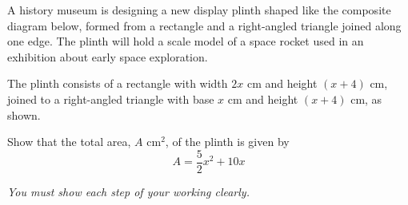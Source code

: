 \begin{question}
\noindent A history museum is designing a new display plinth shaped like the composite diagram below, formed from a rectangle and a right-angled triangle joined along one edge. The plinth will hold a scale model of a space rocket used in an exhibition about early space exploration.

\begin{center}
\end{center}

\noindent The plinth consists of a rectangle with width $2x$ cm and height $(x+4)$ cm, joined to a right-angled triangle with base $x$ cm and height $(x+4)$ cm, as shown.

\noindent Show that the total area, $A$ cm$^2$, of the plinth is given by
\[
A = \frac{5}{2}x^2 + 10x
\]
\vspace{1cm}

\noindent \textit{You must show each step of your working clearly.}
\vspace{5cm}

\begin{flushright}
\end{flushright}
\end{question}
